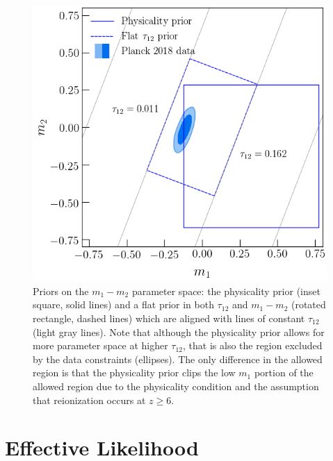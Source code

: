 \documentclass[prd,twocolumn,amsmath,amssymb,floatfix,superscriptaddress,nofootinbib]{revtex4-1}
\begin{document}
 \begin{figure}
          \includegraphics[width=0.9\columnwidth]{paper/plots/pl18_pc_zmax30_pliklite_srollv2_plot_rotated_box_flat_tau_prior_fac_0.8.png}
          \caption {Priors on the $m_1-m_2$ parameter space: the physicality prior (inset square, solid lines) and a flat prior in
          both $\tau_{12}$ and $m_1-m_2$ (rotated rectangle, dashed lines) which are aligned with lines of constant $\tau_{12}$ (light gray lines). Note that although the physicality prior allows for more parameter space at higher $\tau_{12}$, that is also the region excluded by the data constraints (ellipses). The only difference in the allowed region is that the physicality prior clips the low $m_1$ portion of the allowed region due to the physicality condition and the assumption that reionization occurs at $z\ge 6$.} 
          \label{fig:prior_box}
\end{figure}






\section{Effective Likelihood}
\label{sec:effective_likelihood}
\end{document}
